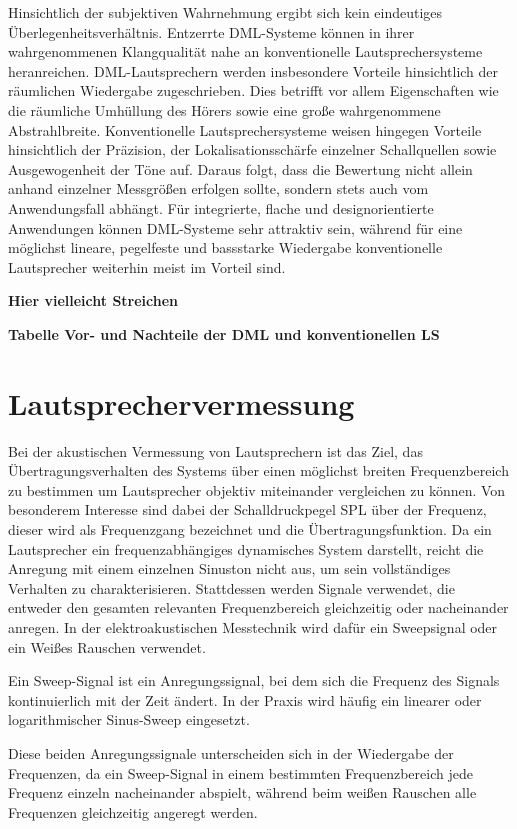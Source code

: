 Hinsichtlich der subjektiven Wahrnehmung ergibt sich kein eindeutiges Überlegenheitsverhältnis. Entzerrte DML-Systeme können in ihrer wahrgenommenen Klangqualität nahe an konventionelle Lautsprechersysteme heranreichen. DML-Lautsprechern werden insbesondere Vorteile hinsichtlich der räumlichen Wiedergabe zugeschrieben. Dies betrifft vor allem Eigenschaften wie die räumliche Umhüllung des Hörers sowie eine große wahrgenommene Abstrahlbreite. Konventionelle Lautsprechersysteme weisen hingegen Vorteile hinsichtlich der Präzision, der Lokalisationsschärfe einzelner Schallquellen sowie Ausgewogenheit der Töne auf. Daraus folgt, dass die Bewertung nicht allein anhand einzelner Messgrößen erfolgen sollte, sondern stets auch vom Anwendungsfall abhängt. Für integrierte, flache und designorientierte Anwendungen können DML-Systeme sehr attraktiv sein, während für eine möglichst lineare, pegelfeste und bassstarke Wiedergabe konventionelle Lautsprecher weiterhin meist im Vorteil sind.

\textbf{Hier vielleicht Streichen}

\textbf{Tabelle Vor- und Nachteile der DML und konventionellen LS}


\section{Lautsprechervermessung}

Bei der akustischen Vermessung von Lautsprechern ist das Ziel, das Übertragungsverhalten des Systems über einen möglichst breiten Frequenzbereich zu bestimmen um Lautsprecher objektiv miteinander vergleichen zu können. Von besonderem Interesse sind dabei der Schalldruckpegel SPL über der Frequenz, dieser wird als Frequenzgang bezeichnet und die Übertragungsfunktion. Da ein Lautsprecher ein frequenzabhängiges dynamisches System darstellt, reicht die Anregung mit einem einzelnen Sinuston nicht aus, um sein vollständiges Verhalten zu charakterisieren. Stattdessen werden Signale verwendet, die entweder den gesamten relevanten Frequenzbereich gleichzeitig oder nacheinander anregen. In der elektroakustischen Messtechnik wird dafür ein Sweepsignal oder ein Weißes Rauschen verwendet.

Ein Sweep-Signal ist ein Anregungssignal, bei dem sich die Frequenz des Signals kontinuierlich mit der Zeit ändert. In der Praxis wird häufig ein linearer oder logarithmischer Sinus-Sweep eingesetzt.

Diese beiden Anregungssignale unterscheiden sich in der Wiedergabe der Frequenzen, da ein Sweep-Signal in einem bestimmten Frequenzbereich jede Frequenz einzeln nacheinander abspielt, während beim weißen Rauschen alle Frequenzen gleichzeitig angeregt werden. 

